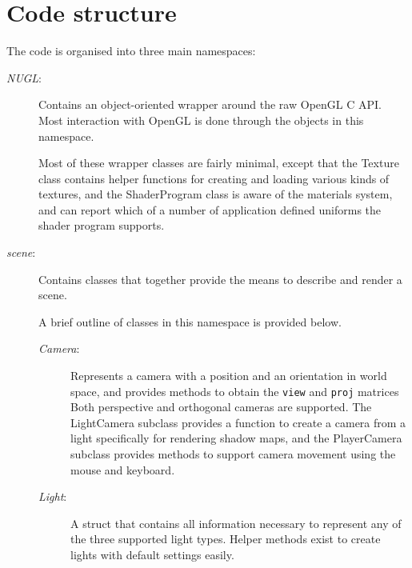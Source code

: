 \documentclass[11pt]{scrartcl} %
\newcommand{\code}[1]{{\texttt{#1}}}
\newcommand{\codefile}[1]{{\textit{#1}}}
\begin{document}
\section{Code structure}

    The code is organised into three main namespaces:

    \begin{description}

        \item[\codefile{NUGL}:]

            Contains an object-oriented wrapper around the raw OpenGL C API.
            Most interaction with OpenGL is done through the objects in this
            namespace.

            Most of these wrapper classes are fairly minimal, except that the
            Texture class contains helper functions for creating and loading
            various kinds of textures, and the ShaderProgram class is aware of
            the materials system, and can report which of a number of
            application defined uniforms the shader program supports.

        \item[\codefile{scene}:]

            Contains classes that together provide the means to describe and render a scene.

            A brief outline of classes in this namespace is provided below.

            \begin{description}

                \item[\codefile{Camera}:]

                    Represents a camera with a position and an orientation in
                    world space, and provides methods to obtain the \code{view}
                    and \code{proj} matrices Both perspective and orthogonal
                    cameras are supported. The LightCamera subclass provides a
                    function to create a camera from a light specifically for
                    rendering shadow maps, and the PlayerCamera subclass
                    provides methods to support camera movement using the mouse
                    and keyboard.

                \item[\codefile{Light}:]

                    A struct that contains all information necessary to
                    represent any of the three supported light types. Helper
                    methods exist to create lights with default settings
                    easily.


\end{description}
\end{description}
\end{document}
